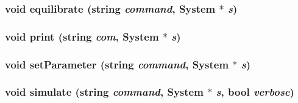 \subsubsection{\setlength{\rightskip}{0pt plus 5cm}void equilibrate (string {\em command}, {\bf System} $\ast$ {\em s})}\label{rnfRunner_8cpp_52cf49501cd90f6136f6a53ecd7ad05e}


\subsubsection{\setlength{\rightskip}{0pt plus 5cm}void print (string {\em com}, {\bf System} $\ast$ {\em s})}\label{rnfRunner_8cpp_c4f5a995e9990312d5ce1dec6cf53a13}


\subsubsection{\setlength{\rightskip}{0pt plus 5cm}void setParameter (string {\em command}, {\bf System} $\ast$ {\em s})}\label{rnfRunner_8cpp_aa3c7ad2f06d02ee262ee60836b76b7b}


\subsubsection{\setlength{\rightskip}{0pt plus 5cm}void simulate (string {\em command}, {\bf System} $\ast$ {\em s}, bool {\em verbose})}\label{rnfRunner_8cpp_7c86f94e9346b716427c1dfd178f6fbf}


